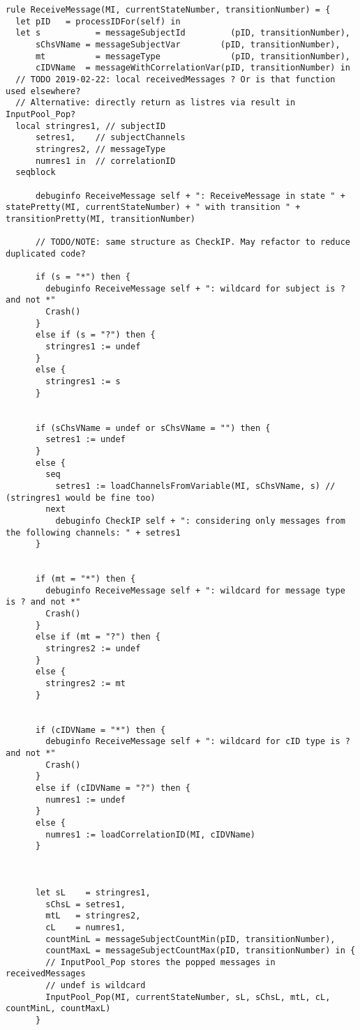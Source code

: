 \begin{listing}[H]
\begin{verbatim}
rule ReceiveMessage(MI, currentStateNumber, transitionNumber) = {
  let pID   = processIDFor(self) in
  let s           = messageSubjectId         (pID, transitionNumber),
      sChsVName = messageSubjectVar        (pID, transitionNumber),
      mt          = messageType              (pID, transitionNumber),
      cIDVName  = messageWithCorrelationVar(pID, transitionNumber) in
  // TODO 2019-02-22: local receivedMessages ? Or is that function used elsewhere?
  // Alternative: directly return as listres via result in InputPool_Pop?
  local stringres1, // subjectID
      setres1,    // subjectChannels
      stringres2, // messageType
      numres1 in  // correlationID
  seqblock

      debuginfo ReceiveMessage self + ": ReceiveMessage in state " + statePretty(MI, currentStateNumber) + " with transition " + transitionPretty(MI, transitionNumber)

      // TODO/NOTE: same structure as CheckIP. May refactor to reduce duplicated code?

      if (s = "*") then {
        debuginfo ReceiveMessage self + ": wildcard for subject is ? and not *"
        Crash()
      }
      else if (s = "?") then {
        stringres1 := undef
      }
      else {
        stringres1 := s
      }


      if (sChsVName = undef or sChsVName = "") then {
        setres1 := undef
      }
      else {
        seq
          setres1 := loadChannelsFromVariable(MI, sChsVName, s) // (stringres1 would be fine too)
        next
          debuginfo CheckIP self + ": considering only messages from the following channels: " + setres1
      }


      if (mt = "*") then {
        debuginfo ReceiveMessage self + ": wildcard for message type is ? and not *"
        Crash()
      }
      else if (mt = "?") then {
        stringres2 := undef
      }
      else {
        stringres2 := mt
      }


      if (cIDVName = "*") then {
        debuginfo ReceiveMessage self + ": wildcard for cID type is ? and not *"
        Crash()
      }
      else if (cIDVName = "?") then {
        numres1 := undef
      }
      else {
        numres1 := loadCorrelationID(MI, cIDVName)
      }



      let sL    = stringres1,
        sChsL = setres1,
        mtL   = stringres2,
        cL    = numres1,
        countMinL = messageSubjectCountMin(pID, transitionNumber),
        countMaxL = messageSubjectCountMax(pID, transitionNumber) in {
        // InputPool_Pop stores the popped messages in receivedMessages
        // undef is wildcard
        InputPool_Pop(MI, currentStateNumber, sL, sChsL, mtL, cL, countMinL, countMaxL)
      }


\end{verbatim}
\end{listing}
